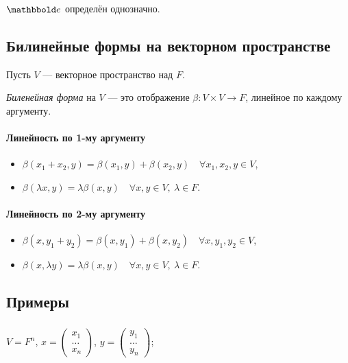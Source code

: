 \begin{exercise}
    $\E$ определён однозначно.
\end{exercise}


\subsection{Билинейные формы на векторном пространстве}

Пусть $V$ --- векторное пространство над $F$.

\begin{definition}
    \textit{Биленейная форма} на $V$ --- это отображение $\beta \colon V \times V \to F$, линейное по каждому аргументу.
\end{definition}

\paragraph{Линейность по 1-му аргументу}
\begin{itemize}[nosep]
\item $\beta(x_1 + x_2, y) = \beta(x_1, y) + \beta(x_2, y) \quad \forall x_1, x_2, y \in V$,
\item $\beta(\lambda x, y) = \lambda\beta(x, y) \quad \forall x, y \in V, \ \lambda \in F$.
\end{itemize}

\paragraph{Линейность по 2-му аргументу}
\begin{itemize}[nosep]
\item $\beta(x, y_1 + y_2) = \beta(x, y_1) + \beta(x, y_2) \quad \forall x, y_1, y_2 \in V$,
\item $\beta(x, \lambda y) = \lambda\beta(x, y) \quad \forall x, y \in V, \ \lambda \in F$.
\end{itemize}


\subsection{Примеры}
\label{lec19:bilinear_examples}

\subsubsection{}

$V = F^n$, $x = \begin{pmatrix} x_1 \\ \dots \\ x_n \end{pmatrix}$, $y = \begin{pmatrix} y_1 \\ \dots \\ y_n \end{pmatrix}$;

